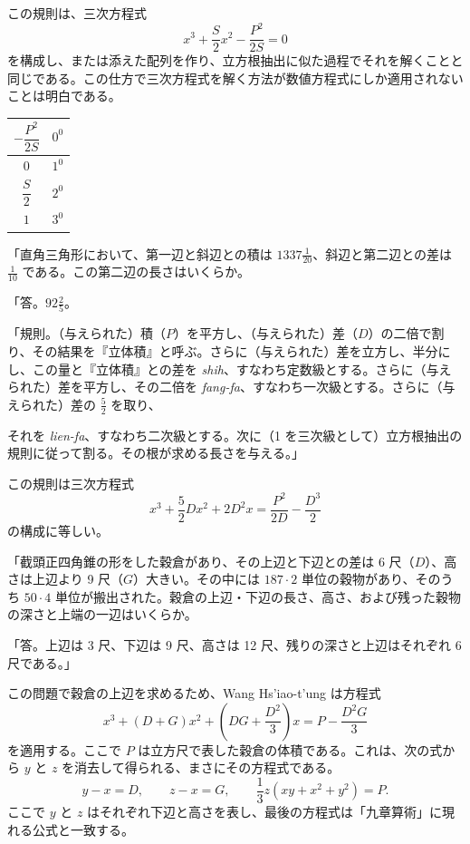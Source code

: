 \documentclass[11pt]{article}
\newcommand{\scanpage}[2]{\clearpage\setcounter{footnote}{0}\noindent{\footnotesize\color{gray}PDF #1 頁 · #2}\par\medskip}
\newcommand{\scanfooter}{}
\begin{document}
この規則は、三次方程式
\[
x^3+\frac{S}{2}x^2-\frac{P^2}{2S}=0
\]
を構成し、または添えた配列を作り、立方根抽出に似た過程でそれを解くことと同じである。この仕方で三次方程式を解く方法が数値方程式にしか適用されないことは明白である。

\begin{center}
\renewcommand{\arraystretch}{1.45}
\begin{tabular}{|c|c|}\hline
$-\dfrac{P^2}{2S}$ & $0^0$\\\hline
$0$ & $1^0$\\\hline
$\dfrac{S}{2}$ & $2^0$\\\hline
$1$ & $3^0$\\\hline
\end{tabular}
\end{center}

「直角三角形において、第一辺と斜辺との積は $1337\frac{1}{20}$、斜辺と第二辺との差は $\frac{1}{10}$ である。この第二辺の長さはいくらか。

「答。$92\frac{2}{5}$。

「規則。（与えられた）積（$P$）を平方し、（与えられた）差（$D$）の二倍で割り、その結果を『立体積』と呼ぶ。さらに（与えられた）差を立方し、半分にし、この量と『立体積』との差を \emph{shih}、すなわち定数級とする。さらに（与えられた）差を平方し、その二倍を \emph{fang-fa}、すなわち一次級とする。さらに（与えられた）差の $\frac{5}{2}$ を取り、
\scanfooter

\scanpage{0069}{第8章、印刷頁55}
それを \emph{lien-fa}、すなわち二次級とする。次に（1 を三次級として）立方根抽出の規則に従って割る。その根が求める長さを与える。」

この規則は三次方程式
\[
x^3+\frac{5}{2}Dx^2+2D^2x=\frac{P^2}{2D}-\frac{D^3}{2}
\]
の構成に等しい。

「截頭正四角錐の形をした穀倉があり、その上辺と下辺との差は 6 尺（$D$）、高さは上辺より 9 尺（$G$）大きい。その中には $187\cdot2$ 単位の穀物があり、そのうち $50\cdot4$ 単位が搬出された。穀倉の上辺・下辺の長さ、高さ、および残った穀物の深さと上端の一辺はいくらか。

「答。上辺は 3 尺、下辺は 9 尺、高さは 12 尺、残りの深さと上辺はそれぞれ 6 尺である。」

この問題で穀倉の上辺を求めるため、Wang Hs'iao-t'ung は方程式
\[
x^3+(D+G)x^2+\left(DG+\frac{D^2}{3}\right)x=P-\frac{D^2G}{3}
\]
を適用する。ここで $P$ は立方尺で表した穀倉の体積である。これは、次の式から $y$ と $z$ を消去して得られる、まさにその方程式である。
\[
y-x=D,\qquad z-x=G,\qquad \frac{1}{3}z(xy+x^2+y^2)=P.
\]
ここで $y$ と $z$ はそれぞれ下辺と高さを表し、最後の方程式は「九章算術」に現れる公式と一致する。
\end{document}
